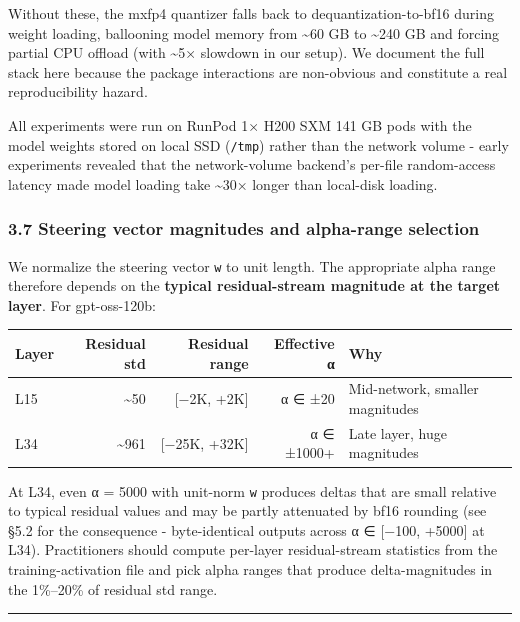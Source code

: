 \documentclass[
]{article}
\newcounter{none} %
\begin{document}
Without these, the mxfp4 quantizer falls back to dequantization-to-bf16
during weight loading, ballooning model memory from \textasciitilde60 GB
to \textasciitilde240 GB and forcing partial CPU offload (with
\textasciitilde5× slowdown in our setup). We document the full stack
here because the package interactions are non-obvious and constitute a
real reproducibility hazard.

All experiments were run on RunPod 1× H200 SXM 141 GB pods with the
model weights stored on local SSD (\texttt{/tmp}) rather than the
network volume - early experiments revealed that the network-volume
backend's per-file random-access latency made model loading take
\textasciitilde30× longer than local-disk loading.

\subsubsection{3.7 Steering vector magnitudes and alpha-range
selection}\label{steering-vector-magnitudes-and-alpha-range-selection}

We normalize the steering vector \texttt{w} to unit length. The
appropriate alpha range therefore depends on the \textbf{typical
residual-stream magnitude at the target layer}. For gpt-oss-120b:

{\def\LTcaptype{none} %
\begin{longtable}[]{@{}lrrrl@{}}
\toprule\noalign{}
Layer & Residual std & Residual range & Effective α & Why \\
\midrule\noalign{}
\endhead
\bottomrule\noalign{}
\endlastfoot
L15 & \textasciitilde50 & {[}−2K, +2K{]} & α ∈ ±20 & Mid-network,
smaller magnitudes \\
L34 & \textasciitilde961 & {[}−25K, +32K{]} & α ∈ ±1000+ & Late layer,
huge magnitudes \\
\end{longtable}
}

At L34, even α = 5000 with unit-norm \texttt{w} produces deltas that are
small relative to typical residual values and may be partly attenuated
by bf16 rounding (see §5.2 for the consequence - byte-identical outputs
across α ∈ {[}−100, +5000{]} at L34). Practitioners should compute
per-layer residual-stream statistics from the training-activation file
and pick alpha ranges that produce delta-magnitudes in the 1\%--20\% of
residual std range.

\begin{center}\rule{0.5\linewidth}{0.5pt}\end{center}
\end{document}
